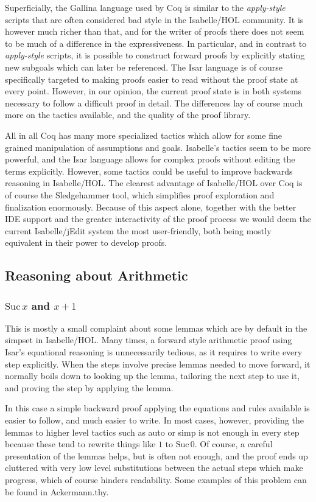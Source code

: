 \documentclass[headsepline,footsepline,footinclude=false,oneside,fontsize=11pt,paper=a4,listof=totoc,bibliography=totoc]{scrbook} %
\begin{document}
Superficially, the Gallina language used by Coq is similar to the \textit{apply-style} scripts that are often considered bad style in the Isabelle/HOL community. It is however much richer than that, and for the writer of proofs there does not seem to be much of a difference in the expressiveness. In particular, and in contrast to \textit{apply-style} scripts, it is possible to construct forward proofs by explicitly stating new subgoals which can later be referenced. The Isar language is of course specifically targeted to making proofs easier to read without the proof state at every point. However, in our opinion, the current proof state is in both systems necessary to follow a difficult proof in detail. The differences lay of course much more on the tactics available, and the quality of the proof library.

All in all Coq has many more specialized tactics \cite{CoqRefMan} which allow for some fine grained manipulation of assumptions and goals. Isabelle's tactics seem to be more powerful, and the Isar language allows for complex proofs without editing the terms explicitly. However, some tactics could be useful to improve backwards reasoning in Isabelle/HOL. The clearest advantage of Isabelle/HOL over Coq is of course the Sledgehammer tool, which simplifies proof exploration and finalization enormously. Because of this aspect alone, together with the better IDE support and the greater interactivity of the proof process we would deem the current Isabelle/jEdit system the most user-friendly, both being mostly equivalent in their power to develop proofs.

\subsection{Reasoning about Arithmetic}
\subsubsection{$\mathrm{Suc}\, x$ and $x + 1$}

This is mostly a small complaint about some lemmas which are by default in the simpset in Isabelle/HOL. Many times, a forward style arithmetic proof using Isar's equational reasoning is unnecessarily tedious, as it requires to write every step explicitly. When the steps involve precise lemmas needed to move forward, it normally boils down to looking up the lemma, tailoring the next step to use it, and proving the step by applying the lemma.

In this case a simple backward proof applying the equations and rules available is easier to follow, and much easier to write. In most cases, however, providing the lemmas to higher level tactics such as auto or simp is not enough in every step because these tend to rewrite things like $1$ to $\mathrm{Suc}\, 0$. Of course, a careful presentation of the lemmas helps, but is often not enough, and the proof ends up cluttered with very low level substitutions between the actual steps which make progress, which of course hinders readability. Some examples of this problem can be found in Ackermann.thy.
\end{document}
